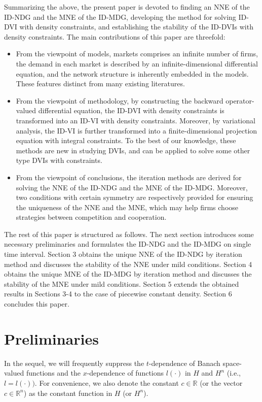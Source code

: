 \documentclass[10pt]{article}
\begin{document}
Summarizing the above, the present paper is  devoted to finding an NNE of the ID-NDG and the MNE of the ID-MDG,  developing the method for solving ID-DVI with density constraints, and establishing the stability of the ID-DVIs with  density constraints.  The main contributions of this paper are threefold:
 \begin{itemize}
 \item From the viewpoint of models, markets comprises an infinite number of firms,  the demand in each market is described by an infinite-dimensional differential equation, and the network structure is inherently embedded in the models. These features distinct from many existing literatures.
  \item From the viewpoint of methodology, by constructing the backward operator-valued differential equation, the ID-DVI with density constraints is transformed into an ID-VI  with density constraints. Moreover, by variational analysis, the ID-VI is further transformed into a finite-dimensional projection equation with integral constraints. To the best of our knowledge, these methods are new in studying DVIs, and can be applied to solve some other type  DVIs with constraints.
 \item From the viewpoint of conclusions, the iteration methods are derived for solving the NNE of the ID-NDG and the MNE of the ID-MDG. Moreover, two conditions with certain symmetry are respectively provided for ensuring the uniqueness of the NNE and the MNE,  which may help  firms choose strategies between competition and cooperation.
\end{itemize}

The rest of this paper is structured as follows. The next section introduces some necessary preliminaries and formulates the ID-NDG and the ID-MDG on single time interval.   Section 3 obtains the unique NNE of the ID-NDG  by iteration method and discusses the stability of the NNE    under  mild conditions.   Section 4   obtains the unique MNE of the ID-MDG by iteration method  and discusses the stability of the MNE under  mild conditions. Section 5 extends the obtained results in Sections 3-4 to the  case of piecewise constant density. Section 6  concludes this paper.

\section{Preliminaries}
In the sequel, we will frequently suppress the $t$-dependence of  Banach space-valued functions and the $x$-dependence of functions $l(\cdot)$ in $H$ and $H^n$ (i.e., $l=l(\cdot))$. For convenience, we also denote the constant $c\in \mathbb{R}$ (or the vector $c\in \mathbb{R}^n$)  as the constant function in $H$ (or $H^n$).
\end{document}
